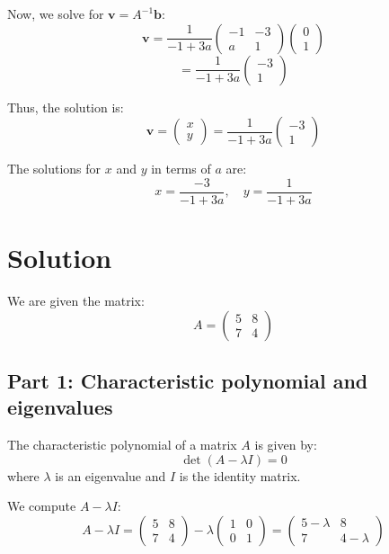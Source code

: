 \documentclass[11pt]{article}
\begin{document}
Now, we solve for \( \mathbf{v} = A^{-1} \mathbf{b} \):
\[
\mathbf{v} = \frac{1}{-1 + 3a} \begin{pmatrix} -1 & -3 \\ a & 1 \end{pmatrix} \begin{pmatrix} 0 \\ 1 \end{pmatrix}
\]
\[
= \frac{1}{-1 + 3a} \begin{pmatrix} -3 \\ 1 \end{pmatrix}
\]

Thus, the solution is:
\[
\mathbf{v} = \begin{pmatrix} x \\ y \end{pmatrix} = \frac{1}{-1 + 3a} \begin{pmatrix} -3 \\ 1 \end{pmatrix}
\]

The solutions for \( x \) and \( y \) in terms of \( a \) are:
\[
x = \frac{-3}{-1 + 3a}, \quad y = \frac{1}{-1 + 3a}
\]




\newpage

\section{Solution}

We are given the matrix:
\[
A = \begin{pmatrix} 5 & 8 \\ 7 & 4 \end{pmatrix}
\]

\subsection{Part 1: Characteristic polynomial and eigenvalues}

The characteristic polynomial of a matrix \( A \) is given by:
\[
\det(A - \lambda I) = 0
\]
where \( \lambda \) is an eigenvalue and \( I \) is the identity matrix.

We compute \( A - \lambda I \):
\[
A - \lambda I = \begin{pmatrix} 5 & 8 \\ 7 & 4 \end{pmatrix} - \lambda \begin{pmatrix} 1 & 0 \\ 0 & 1 \end{pmatrix} = \begin{pmatrix} 5 - \lambda & 8 \\ 7 & 4 - \lambda \end{pmatrix}
\]
\end{document}
